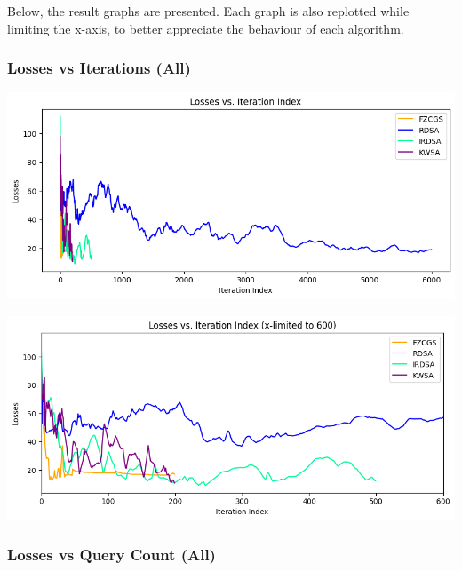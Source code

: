 \documentclass[10pt,twocolumn,letterpaper]{article}
\begin{document}
Below, the result graphs are presented. Each graph is also replotted
while limiting the x-axis, to better appreciate the behaviour of each algorithm.

\subsubsection*{Losses vs Iterations (All)}

\begin{center}
   \includegraphics*[scale=0.35]{img/All_loss_vs_iterations.png}
\end{center}
\begin{center}
   \includegraphics*[scale=0.35]{img/xLimit_All_loss_vs_iterations.png}\\
\end{center} 

\subsubsection*{Losses vs Query Count (All)}
\end{document}
